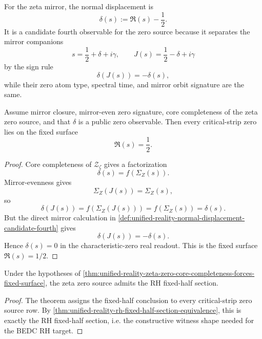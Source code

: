 \begin{definition}
\label{def:unified-reality-normal-displacement-candidate-fourth}
For the zeta mirror, the normal displacement is
$$
\delta(s):=\Re(s)-\frac12.
$$
It is a candidate fourth observable for the zero source because it
separates the mirror companions
$$
s=\frac12+\delta+i\gamma,
\qquad
J(s)=\frac12-\delta+i\gamma
$$
by the sign rule
$$
\delta(J(s))=-\delta(s),
$$
while their zero atom type, spectral time, and mirror orbit signature
are the same.
\end{definition}

\begin{theorem}
\label{thm:unified-reality-zeta-zero-core-completeness-forces-fixed-surface}
Assume mirror closure, mirror-even zero signature, core completeness of
the zeta zero source, and that $\delta$ is a public zero observable.
Then every critical-strip zero lies on the fixed surface
$$
\Re(s)=\frac12.
$$
\end{theorem}

\begin{proof}
Core completeness of $\mathcal Z_{\zeta}$ gives a factorization
$$
\delta(s)=f(\Sigma_Z(s)).
$$
Mirror-evenness gives
$$
\Sigma_Z(J(s))=\Sigma_Z(s),
$$
so
$$
\delta(J(s))=f(\Sigma_Z(J(s)))=f(\Sigma_Z(s))=\delta(s).
$$
But the direct mirror calculation in
\autoref{def:unified-reality-normal-displacement-candidate-fourth} gives
$$
\delta(J(s))=-\delta(s).
$$
Hence $\delta(s)=0$ in the characteristic-zero real readout.  This is
the fixed surface $\Re(s)=1/2$.
\end{proof}

\begin{corollary}
\label{cor:unified-reality-core-completeness-gives-rh-witness-shape}
Under the hypotheses of
\autoref{thm:unified-reality-zeta-zero-core-completeness-forces-fixed-surface},
the zeta zero source admits the RH fixed-half section.
\end{corollary}

\begin{proof}
The theorem assigns the fixed-half conclusion to every critical-strip
zero source row.  By
\autoref{thm:unified-reality-rh-fixed-half-section-equivalence}, this is
exactly the RH fixed-half section, i.e. the constructive witness shape
needed for the BEDC RH target.
\end{proof}

